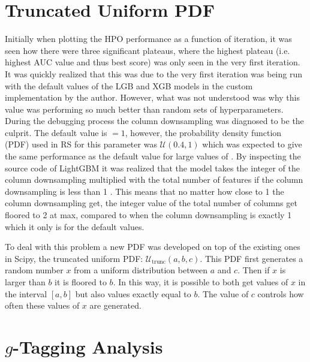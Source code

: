 \section{Truncated Uniform PDF}
\label{sec:q:trunc_uniform}

Initially when plotting the HPO performance as a function of iteration, it was seen how there were three significant plateaus, where the highest plateau (i.e. highest AUC value and thus best score) was only seen in the very first iteration. It was quickly realized that this was due to the very first iteration was being run with the default values of the LGB and XGB models in the custom implementation by the author. However, what was not understood was why this value was performing so much better than random sets of hyperparameters. During the debugging process the column downsampling  was diagnosed to be the culprit. The default value is $=1$, however, the probability density function (PDF) used in RS for this parameter was $\mathcal{U}(0.4, 1)$ which was expected to give the same performance as the default value for large values of . By inspecting the source code of LightGBM it was realized that the model takes the integer of the column downsampling multiplied with the total number of features if the column downsampling is less than \num{1} \autocite{MicrosoftLightGBM}. This means that no matter how close to \num{1} the column downsampling get, the integer value of the total number of columns get floored to \num{2} at max, compared to when the column downsampling is exactly \num{1} which it only is for the default values.

To deal with this problem a new PDF was developed on top of the existing ones in Scipy, the truncated uniform PDF: $\mathcal{U}_\mathrm{trunc}(a, b, c)$. This PDF first generates a random number $x$ from a uniform distribution between $a$ and $c$. Then if $x$ is larger than $b$ it is floored to $b$. In this way, it is possible to both get values of $x$ in the interval $[a, b]$ but also values exactly equal to $b$. The value of $c$ controls how often these  values of $x$ are generated.




\FloatBarrier
\section[g-Tagging Analysis]{$g$-Tagging Analysis}
\label{sec:q:g_tagging_analysis}

